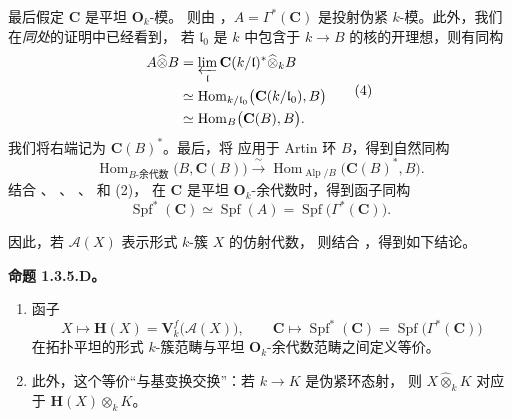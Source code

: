 最后假定 \(\mathbf C\) 是平坦 \(\mathbf O_k\)-模。
则由 ，\(A=\Gamma^*(\mathbf C)\)
是投射伪紧 \(k\)-模。此外，我们在\emph{同处}的证明中已经看到，
若 \(\mathfrak l_0\) 是 \(k\) 中包含于 \(k\to B\) 的核的开理想，则有同构
\begin{equation}
\begin{aligned}
  A\widehat{\otimes}B
  &=
  \varprojlim_{\mathfrak l}
    \mathbf C(k/\mathfrak l)^*\widehat{\otimes}_kB
  \\
  &\simeq
  \operatorname{Hom}_{k/\mathfrak l_0}
    \bigl(\mathbf C(k/\mathfrak l_0),B\bigr)
  \\
  &\simeq
  \operatorname{Hom}_B\bigl(\mathbf C(B),B\bigr).
\end{aligned}
\tag{4}
\label{sga3:VIIB:1.3.5.C:4}
\end{equation}
我们将右端记为 \(\mathbf C(B)^*\)。最后，将
 应用于 Artin 环 \(B\)，得到自然同构
\begin{equation}
  \operatorname{Hom}_{B\text{-余代数}}\bigl(B,\mathbf C(B)\bigr)
  \xrightarrow{\ \sim\ }
  \operatorname{Hom}_{\operatorname{Alp}/B}
    \bigl(\mathbf C(B)^*,B\bigr).
\tag{5}
\label{sga3:VIIB:1.3.5.C:5}
\end{equation}
结合 \textup{}、
\textup{}、
\textup{}、
\textup{} 和 \textup{(2)}，
在 \(\mathbf C\) 是平坦 \(\mathbf O_k\)-余代数时，得到函子同构
\begin{equation}
  \operatorname{Spf}^*(\mathbf C)
  \simeq
  \operatorname{Spf}(A)
  =
  \operatorname{Spf}\bigl(\Gamma^*(\mathbf C)\bigr).
\tag{\(\star\)}
\label{sga3:VIIB:1.3.5.C:star}
\end{equation}

因此，若 \(\mathcal A(X)\) 表示形式 \(k\)-簇 \(X\) 的仿射代数，
则结合 ，得到如下结论。

\medskip
\noindent\textbf{命题 1.3.5.D。}
\label{sga3:VIIB:1.3.5.D}
{\itshape
\begin{enumerate}
  \item[\textup{(i)}]
  函子
  \[
    X\longmapsto
    \mathbf H(X)=\mathbf V_k^f\bigl(\mathcal A(X)\bigr),
    \qquad
    \mathbf C\longmapsto
    \operatorname{Spf}^*(\mathbf C)
    =
    \operatorname{Spf}\bigl(\Gamma^*(\mathbf C)\bigr)
  \]
  在拓扑平坦的形式 \(k\)-簇范畴与平坦 \(\mathbf O_k\)-余代数范畴之间定义等价。

  \item[\textup{(ii)}]
  此外，这个等价“与基变换交换”：若 \(k\to K\) 是伪紧环态射，
  则 \(X\widehat{\otimes}_kK\) 对应于 \(\mathbf H(X)\otimes_kK\)。
\end{enumerate}}

